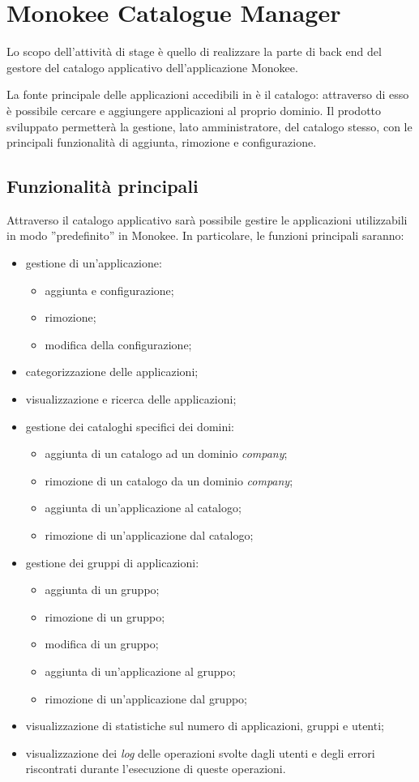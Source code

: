 \section{Monokee Catalogue Manager} \label{catmgr}
Lo scopo dell'attività di stage è quello di realizzare la parte di back end del gestore del catalogo applicativo dell'applicazione Monokee. 

La fonte principale delle applicazioni accedibili in  è il catalogo: attraverso di esso è possibile cercare e aggiungere applicazioni al proprio dominio. Il prodotto sviluppato permetterà la gestione, lato amministratore, del catalogo stesso, con le principali funzionalità di aggiunta, rimozione e configurazione.

\subsection{Funzionalità principali}
Attraverso il catalogo applicativo sarà possibile gestire le applicazioni utilizzabili in modo ''predefinito'' in Monokee. In particolare, le funzioni principali saranno:
\begin{itemize}
\item gestione di un'applicazione:
\begin{itemize}
	\item aggiunta e configurazione;
	\item rimozione;
	\item modifica della configurazione;
\end{itemize}
\item categorizzazione delle applicazioni;
\item visualizzazione e ricerca delle applicazioni;
\item gestione dei cataloghi specifici dei domini:
\begin{itemize}
	\item aggiunta di un catalogo ad un dominio \textit{company};
	\item rimozione di un catalogo da un dominio \textit{company};
	\item aggiunta di un'applicazione al catalogo;
	\item rimozione di un'applicazione dal catalogo;
\end{itemize}
\item gestione dei gruppi di applicazioni:
\begin{itemize}
	\item aggiunta di un gruppo;
	\item rimozione di un gruppo;
	\item modifica di un gruppo;
	\item aggiunta di un'applicazione al gruppo;
	\item rimozione di un'applicazione dal gruppo;
\end{itemize}
\item visualizzazione di statistiche sul numero di applicazioni, gruppi e utenti;
\item visualizzazione dei \textit{log} delle operazioni svolte dagli utenti e degli errori riscontrati durante l'esecuzione di queste operazioni.
\end{itemize}

